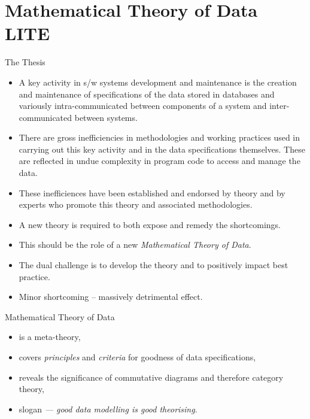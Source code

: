 \section{Mathematical Theory of Data LITE}

\begin{frame}{The Thesis}
\begin{itemize}[<+->]
  \item A key activity in s/w systems development and maintenance is the creation and maintenance of specifications of the data stored in databases and variously intra-communicated between components of a system and inter-communicated between systems. 
  \item There are gross inefficiencies in methodologies and working practices used in carrying out this key activity and in the data specifications themselves. These are reflected in undue complexity in program code to access and manage the data.
  \item These inefficiences have been established and endorsed by theory and by experts who promote this theory and associated methodologies.
  \item A new theory is required to both expose and remedy the shortcomings.
  \item This should be the role of a new \textit{Mathematical Theory of Data}.
  \item The dual challenge is to develop the theory and to positively impact best practice.
  \item Minor shortcoming -- massively detrimental effect.
\end{itemize}
\end{frame}

\begin{frame}{Mathematical Theory of Data}
\begin{itemize}
\item is a meta-theory,
\item covers \textit{principles} and \textit{criteria} for goodness of data specifications,
\item reveals the significance of commutative diagrams and therefore category theory,
\item slogan \textit{--- good data modelling is good theorising}. 
\end{itemize}
\end{frame}







